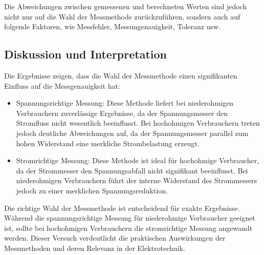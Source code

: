 Die Abweichungen zwischen gemessenen und berechneten Werten sind jedoch nicht nur auf die Wahl der Messmethode zurückzuführen, sondern auch auf folgende Faktoren, wie Messfehler, Messungenauigkeit, Toleranz usw.

\newpage
\subsection{Diskussion und Interpretation}
Die Ergebnisse zeigen, dass die Wahl der Messmethode einen signifikanten Einfluss auf die Messgenauigkeit hat:
\begin{itemize}
    \item Spannungsrichtige Messung: Diese Methode liefert bei niederohmigen Verbrauchern zuverlässige Ergebnisse, da der Spannungsmesser den Stromfluss nicht wesentlich beeinflusst. Bei hochohmigen Verbrauchern treten jedoch deutliche Abweichungen auf, da der Spannungsmesser parallel zum hohen Widerstand eine merkliche Strombelastung erzeugt.
    \item Stromrichtige Messung: Diese Methode ist ideal für hochohmige Verbraucher, da der Strommesser den Spannungsabfall nicht signifikant beeinflusst. Bei niederohmigen Verbrauchern führt der interne Widerstand des Strommessers jedoch zu einer merklichen Spannungsreduktion.
\end{itemize}

Die richtige Wahl der Messmethode ist entscheidend für exakte Ergebnisse. Während die spannungsrichtige Messung für niederohmige Verbraucher geeignet ist, sollte bei hochohmigen Verbrauchern die stromrichtige Messung angewandt werden. Dieser Versuch verdeutlicht die praktischen Auswirkungen der Messmethoden und deren Relevanz in der Elektrotechnik.

\newpage